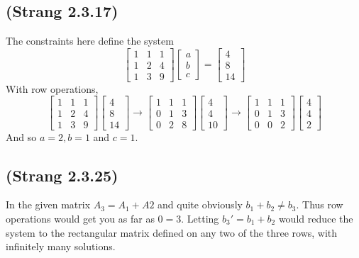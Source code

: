 \documentclass[10pt]{article}
\begin{document}
\subsection{(Strang 2.3.17)}
The constraints here define the system
\[
\begin{bmatrix}1& 1& 1\\ 1& 2& 4\\ 1& 3& 9\end{bmatrix}\begin{bmatrix}a\\b\\c\end{bmatrix}=
\begin{bmatrix}4\\8\\14\end{bmatrix}
\]
With row operations,
\[
\begin{bmatrix}1& 1& 1\\ 1& 2& 4\\ 1& 3& 9\end{bmatrix}\begin{bmatrix}4\\8\\14\end{bmatrix}\rightarrow
\begin{bmatrix}1& 1& 1\\ 0& 1& 3\\ 0& 2& 8\end{bmatrix}\begin{bmatrix}4\\4\\10\end{bmatrix}\rightarrow
\begin{bmatrix}1& 1& 1\\ 0& 1& 3\\ 0& 0& 2\end{bmatrix}\begin{bmatrix}4\\4\\2\end{bmatrix}
\]
And so $a=2, b=1$ and $c=1$.

\subsection{(Strang 2.3.25)}
In the given matrix $A_3 = A_1 + A2$ and quite obviously $b_1 + b_2 \neq b_3$. Thus row operations would get you as far as $0 = 3$. Letting $b_{3}' = b_1 + b_2$ would reduce the system to the rectangular matrix defined on any two of the three rows, with infinitely many solutions. 
\end{document}
